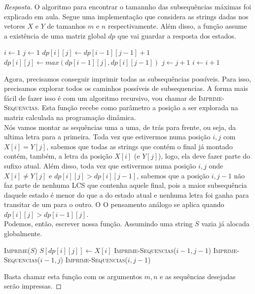 \documentclass[12pt]{article}
\begin{document}
\begin{proof}[Resposta]
O algoritmo para encontrar o tamannho das subsequências máximas foi explicado em aula. Segue uma implementação que considera as strings dadas nos vetores $X$ e $Y$ de tamanhos $m$ e $n$ respectivamente. Além disso, a função assume a existência de uma matriz global $dp$ que vai guardar a resposta dos estados.

\begin{algorithmic}[1]
    \State $i \gets 1$
        \State $j \gets 1$
                \State $dp[i][j] \gets dp[i-1][j-1] + 1$
            \Else
                \State $dp[i][j] \gets \textit{max}(dp[i-1][j], dp[i][j-1])$
            \EndIf
            \State $j \gets j+1$
        \EndWhile
        \State $i \gets i+1$
    \EndWhile
\EndFunction
\end{algorithmic}

Agora, precisamos conseguir imprimir todas as subsequências possíveis. Para isso, precisamos explorar todos os caminhos possíveis de subsequencias. A forma mais fácil de fazer isso é com um algoritmo recursivo, vou chamar de \textsc{Imprime-Sequencias}. Esta função recebe como parâmetro a posição a ser explorada na matriz calculada na programação dinâmica. \\
Nós vamos montar as sequências uma a uma, de trás para frente, ou seja, da ultima letra para a primeira. Toda vez que estivermos numa posição $i,j$ com $X[i] = Y[j]$, sabemos que todas as strings que contém o final já montado contém, também, a letra da posição $X[i]$ (e $Y[j]$), logo, ela deve fazer parte do sufixo atual. Além disso, toda vez que estivermos numa posição $i,j$ onde $X[i] \neq Y[j]$ e $dp[i][j] > dp[i][j-1]$, sabemos que a posição $i,j-1$ não faz parte de nenhuma LCS que contenha aquele final, pois a maior subsequência daquele estado é menor do que a do estado atual e nenhuma letra foi ganha para transitar de um para o outro. O O pensamento análogo se aplica quando $dp[i][j] > dp[i-1][j]$. \\
Podemos, então, escrever nossa função. Assumindo uma string $S$ vazia já alocada globalmente. \\

\begin{algorithmic}[1]
    \State \textsc{Imprime}($S$)
\Else
        \State $S[dp[i][j]] \gets X[i]$
        \State \textsc{Imprime-Sequencias}($i-1, j-1$)
    \Else
            \State \textsc{Imprime-Sequencias}($i-1, j$)
        \EndIf
            \State \textsc{Imprime-Sequencias}($i, j-1$)
        \EndIf
    \EndIf
\EndIf
\EndFunction
\end{algorithmic}

Basta chamar esta função com os argumentos $m, n$ e as sequências desejadas serão impressas.
\end{proof}
\end{document}
